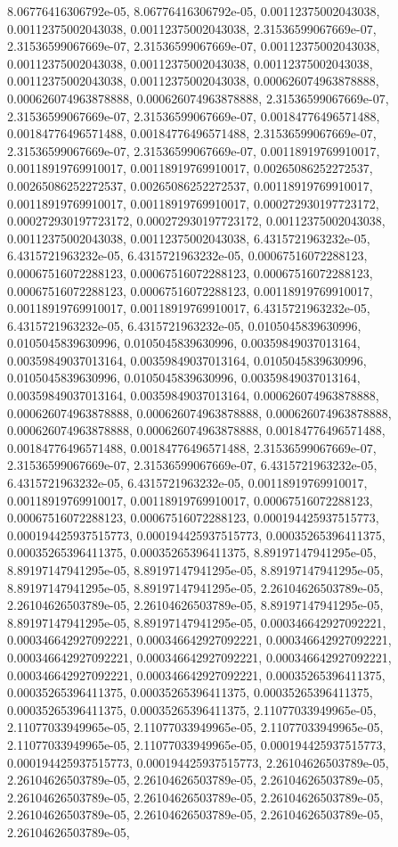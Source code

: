 \documentclass[
  ,man]{apa6}
\begin{document}
8.06776416306792e-05, 8.06776416306792e-05, 0.00112375002043038, 0.00112375002043038, 0.00112375002043038, 2.31536599067669e-07, 2.31536599067669e-07, 2.31536599067669e-07, 0.00112375002043038, 0.00112375002043038, 0.00112375002043038, 0.00112375002043038, 0.00112375002043038, 0.00112375002043038, 0.000626074963878888, 0.000626074963878888, 0.000626074963878888, 2.31536599067669e-07, 2.31536599067669e-07, 2.31536599067669e-07, 0.00184776496571488, 0.00184776496571488, 0.00184776496571488, 2.31536599067669e-07,
2.31536599067669e-07, 2.31536599067669e-07, 0.00118919769910017, 0.00118919769910017, 0.00118919769910017, 0.00265086252272537, 0.00265086252272537, 0.00265086252272537, 0.00118919769910017, 0.00118919769910017, 0.00118919769910017, 0.000272930197723172, 0.000272930197723172, 0.000272930197723172, 0.00112375002043038, 0.00112375002043038, 0.00112375002043038, 6.4315721963232e-05, 6.4315721963232e-05, 6.4315721963232e-05, 0.00067516072288123, 0.00067516072288123, 0.00067516072288123, 0.00067516072288123,
0.00067516072288123, 0.00067516072288123, 0.00118919769910017, 0.00118919769910017, 0.00118919769910017, 6.4315721963232e-05, 6.4315721963232e-05, 6.4315721963232e-05, 0.0105045839630996, 0.0105045839630996, 0.0105045839630996, 0.00359849037013164, 0.00359849037013164, 0.00359849037013164, 0.0105045839630996, 0.0105045839630996, 0.0105045839630996, 0.00359849037013164, 0.00359849037013164, 0.00359849037013164, 0.000626074963878888, 0.000626074963878888, 0.000626074963878888, 0.000626074963878888,
0.000626074963878888, 0.000626074963878888, 0.00184776496571488, 0.00184776496571488, 0.00184776496571488, 2.31536599067669e-07, 2.31536599067669e-07, 2.31536599067669e-07, 6.4315721963232e-05, 6.4315721963232e-05, 6.4315721963232e-05, 0.00118919769910017, 0.00118919769910017, 0.00118919769910017, 0.00067516072288123, 0.00067516072288123, 0.00067516072288123, 0.000194425937515773, 0.000194425937515773, 0.000194425937515773, 0.00035265396411375, 0.00035265396411375, 0.00035265396411375, 8.89197147941295e-05,
8.89197147941295e-05, 8.89197147941295e-05, 8.89197147941295e-05, 8.89197147941295e-05, 8.89197147941295e-05, 2.26104626503789e-05, 2.26104626503789e-05, 2.26104626503789e-05, 8.89197147941295e-05, 8.89197147941295e-05, 8.89197147941295e-05, 0.000346642927092221, 0.000346642927092221, 0.000346642927092221, 0.000346642927092221, 0.000346642927092221, 0.000346642927092221, 0.000346642927092221, 0.000346642927092221, 0.000346642927092221, 0.00035265396411375, 0.00035265396411375, 0.00035265396411375,
0.00035265396411375, 0.00035265396411375, 0.00035265396411375, 2.11077033949965e-05, 2.11077033949965e-05, 2.11077033949965e-05, 2.11077033949965e-05, 2.11077033949965e-05, 2.11077033949965e-05, 0.000194425937515773, 0.000194425937515773, 0.000194425937515773, 2.26104626503789e-05, 2.26104626503789e-05, 2.26104626503789e-05, 2.26104626503789e-05, 2.26104626503789e-05, 2.26104626503789e-05, 2.26104626503789e-05, 2.26104626503789e-05, 2.26104626503789e-05, 2.26104626503789e-05, 2.26104626503789e-05,
\end{document}
